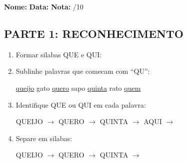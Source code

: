 \begin{exercicio}
\noindent\textbf{Nome:} \underline{\hspace{3.2cm}} \quad \textbf{Data:} \underline{\hspace{1.6cm}} \quad \textbf{Nota:} \underline{\hspace{0.9cm}}/10

\subsection*{PARTE 1: RECONHECIMENTO}

\begin{enumerate}
  \item Formar silabas QUE e QUI:
  \begin{center}
   \quad {}
  \end{center}

  \item Sublinhe palavras que comecam com ``QU'':
  \begin{center}
  \uline{queijo} \quad gato \quad \uline{quero} \quad sapo \quad \uline{quinta} \quad rato \quad \uline{quem}
  \end{center}

  \item Identifique QUE ou QUI em cada palavra:
  \begin{center}
  QUEIJO $\rightarrow$ \underline{\hspace{1cm}} \quad QUERO $\rightarrow$ \underline{\hspace{1cm}} \quad QUINTA $\rightarrow$ \underline{\hspace{1cm}} \quad AQUI $\rightarrow$ \underline{\hspace{1cm}}
  \end{center}

  \item Separe em silabas:
  \begin{center}
  QUEIJO $\rightarrow$ \underline{\hspace{1cm}} \underline{\hspace{1cm}} \quad QUERO $\rightarrow$ \underline{\hspace{1cm}} \underline{\hspace{1cm}} \quad QUINTA $\rightarrow$ \underline{\hspace{1cm}} \underline{\hspace{1cm}}
  \end{center}


\end{enumerate}
\end{exercicio}
